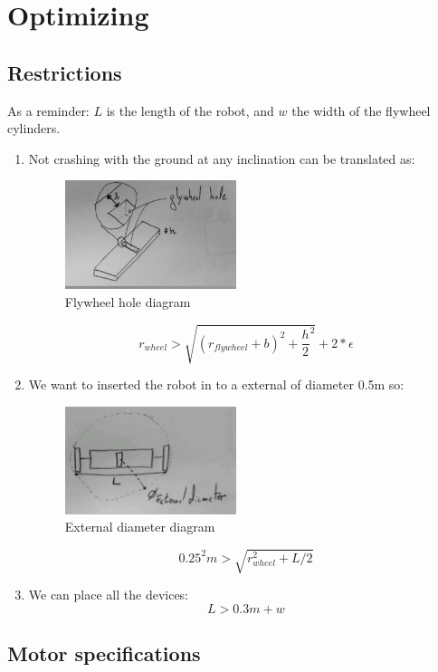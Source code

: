 \section{Optimizing}

\subsection{Restrictions}
As a reminder: $L$ is the length of the robot, and $w$ the width of the flywheel cylinders.
\begin{enumerate}
\item Not crashing with the ground at any inclination can be translated as:
\begin{figure}[ht]
	\centering
	\includegraphics[width=5cm]{img/flywheel_hole.jpg}
	\caption{Flywheel hole diagram}
	\label{fig:Flywheel hole diagram}
\end{figure}
\[r_{wheel}> \sqrt{(r_{flywheel} + b)^2+\frac{h}{2}^2} + 2*\epsilon\]
\item We want to inserted the robot in to a external of diameter 0.5m so:
\begin{figure}[ht]
	\centering
	\includegraphics[width=5cm]{img/external_diameter.jpg}
	\caption{External diameter diagram}
	\label{fig:External diameter diagram}
\end{figure}
\[0.25^2 m > \sqrt{r_{wheel}^2 + L/2}\]
\item We can place all the devices:
\[L > 0.3m + w \]
\end{enumerate}

\subsection{Motor specifications}

